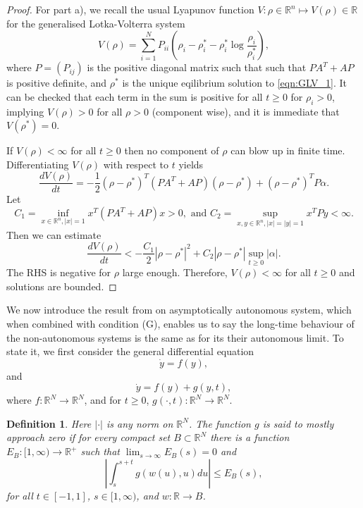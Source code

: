 \documentclass{article}
\newtheorem{definition}{Definition}[section]
\begin{document}
\begin{proof}
For part a),  we recall the usual Lyapunov function $V:\rho\in\mathbb{R}^n\mapsto{}V(\rho)\in\mathbb{R}$ for the generalised Lotka-Volterra system
 \[V(\rho)=\sum_{i=1}^NP_{ii}\left(\rho_i-\rho_i^{*}-\rho_{i}^{*}\log\frac{\rho_i}{\rho_i^{*{}}}\right),\]
 where $P=(P_{ij})$ is the positive diagonal matrix such that  such that $PA^T+AP$ is positive definite, and $\rho^{*}$ is the unique eqilibrium solution to \eqref{eqn:GLV_1}. It can be checked that each term in the sum is positive for all $t\geq{0}$ for $\rho_i>0$, implying $V(\rho)>0$ for all $\rho>0$ (component wise), and it is immediate that $V(\rho^{*})=0$.  

If  $V(\rho)<\infty$ for all $t\geq{0}$ then no component of $\rho$ can blow up in finite time.   Differentiating $V(\rho)$ with respect to $t$ yields
 \[\frac{dV(\rho)}{dt}=-\frac{1}{2}(\rho-\rho^{*})^T(PA^T+AP)(\rho-\rho^{*})+(\rho-\rho^{*})^TP\alpha.\]
Let \[C_1=\inf_{x\in\mathbb{R}^n,|x|=1}x^T(PA^T+AP)x>0,\text{ and }C_2=\sup_{x,y\in\mathbb{R}^n,|x|=|y|=1}x^TPy<\infty.\] Then we can estimate
 \[\frac{dV(\rho)}{dt}<-\frac{C_1}{2}|\rho-\rho^{*}|^2+C_2|\rho-\rho^{*}|\sup_{t\geq{0}}|\alpha|.\]
 The RHS is negative for $\rho$ large enough. Therefore, $V(\rho)<\infty$ for all $t\geq{0}$ and solutions are bounded.
\end{proof}

We now introduce the result from \cite{strauss1967asymptotically}  on asymptotically autonomous system, which when combined with condition (G), enables us to say the long-time behaviour of the non-autonomous systems is the same as for its their autonomous limit. To state it, we first consider the general differential equation  \begin{equation}\label{eqn:GenAut}
      \dot{y}=f(y),
  \end{equation}
   and 
     \begin{equation}\label{eqn:GenNonAut}
   \dot{y}=f(y)+g(y,t),
  \end{equation}
   where $f:\mathbb{R}^N\to\mathbb{R}^N$, and for $t\geq{0}$, $g(\cdot,t):\mathbb{R}^N\to\mathbb{R}^N$. 
   \begin{definition}
       Here $\vert\cdot\vert$ is any norm on $\mathbb{R}^N$. The function $g$ is said to mostly approach zero if for every compact set $B\subset\mathbb{R}^N$ there is a function $E_B:[1,\infty)\to\mathbb{R}^{+}$ such that $\lim_{s\rightarrow\infty}E_B(s)=0$ and
    \[\left\vert\int_{s}^{s+t}g(w(u),u)du\right\vert\leq{}E_B(s),\]
    for all $t\in[-1,1]$, $s\in[1,\infty)$, and $w:\mathbb{R}\to{B}$.
   \end{definition}
   
\end{document}
